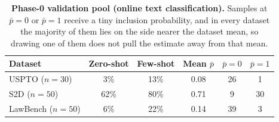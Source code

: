 \begin{table}[t]
\centering
\caption{\textbf{Phase-0 validation pool (online text classification).} Samples at $\bar{p}{=}0$ or $\bar{p}{=}1$ receive a tiny inclusion probability, and in every dataset the majority of them lies on the side nearer the dataset mean, so drawing one of them does not pull the estimate away from that mean.}
\label{table:tc_phase0}
\small
\setlength{\tabcolsep}{6pt}
\begin{tabular}{lccccc}
\toprule
\textbf{Dataset} & \textbf{Zero-shot} & \textbf{Few-shot} & \textbf{Mean }{\boldmath$\bar{p}$} & {\boldmath$\bar{p}=0$} & {\boldmath$\bar{p}=1$} \\
\midrule
USPTO ($n{=}30$) & 3\% & 13\% & 0.08 & 26 & 1 \\
S2D ($n{=}50$) & 62\% & 80\% & 0.71 & 9 & 30 \\
LawBench ($n{=}50$) & 6\% & 22\% & 0.14 & 39 & 3 \\
\bottomrule
\end{tabular}
\end{table}